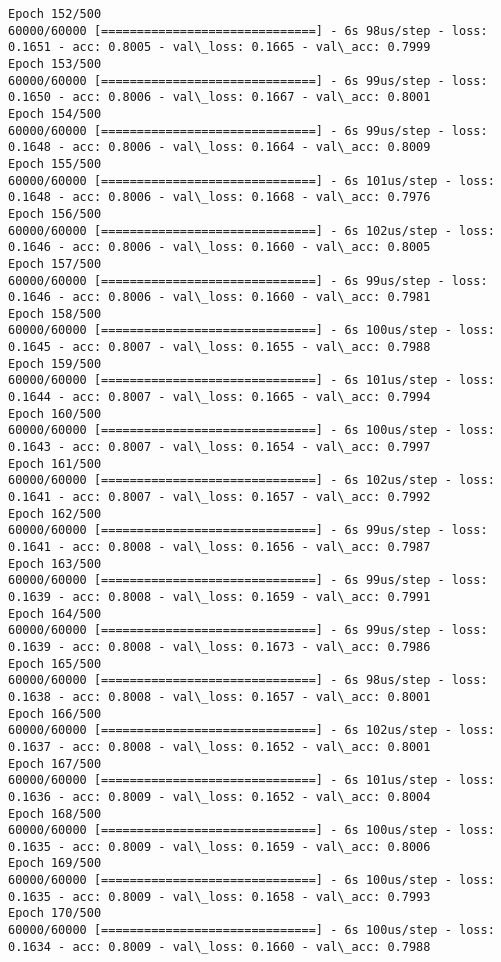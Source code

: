 \documentclass[11pt]{article}
\begin{document}
\begin{Verbatim}[commandchars=\\\{\}]
Epoch 152/500
60000/60000 [==============================] - 6s 98us/step - loss: 0.1651 - acc: 0.8005 - val\_loss: 0.1665 - val\_acc: 0.7999
Epoch 153/500
60000/60000 [==============================] - 6s 99us/step - loss: 0.1650 - acc: 0.8006 - val\_loss: 0.1667 - val\_acc: 0.8001
Epoch 154/500
60000/60000 [==============================] - 6s 99us/step - loss: 0.1648 - acc: 0.8006 - val\_loss: 0.1664 - val\_acc: 0.8009
Epoch 155/500
60000/60000 [==============================] - 6s 101us/step - loss: 0.1648 - acc: 0.8006 - val\_loss: 0.1668 - val\_acc: 0.7976
Epoch 156/500
60000/60000 [==============================] - 6s 102us/step - loss: 0.1646 - acc: 0.8006 - val\_loss: 0.1660 - val\_acc: 0.8005
Epoch 157/500
60000/60000 [==============================] - 6s 99us/step - loss: 0.1646 - acc: 0.8006 - val\_loss: 0.1660 - val\_acc: 0.7981
Epoch 158/500
60000/60000 [==============================] - 6s 100us/step - loss: 0.1645 - acc: 0.8007 - val\_loss: 0.1655 - val\_acc: 0.7988
Epoch 159/500
60000/60000 [==============================] - 6s 101us/step - loss: 0.1644 - acc: 0.8007 - val\_loss: 0.1665 - val\_acc: 0.7994
Epoch 160/500
60000/60000 [==============================] - 6s 100us/step - loss: 0.1643 - acc: 0.8007 - val\_loss: 0.1654 - val\_acc: 0.7997
Epoch 161/500
60000/60000 [==============================] - 6s 102us/step - loss: 0.1641 - acc: 0.8007 - val\_loss: 0.1657 - val\_acc: 0.7992
Epoch 162/500
60000/60000 [==============================] - 6s 99us/step - loss: 0.1641 - acc: 0.8008 - val\_loss: 0.1656 - val\_acc: 0.7987
Epoch 163/500
60000/60000 [==============================] - 6s 99us/step - loss: 0.1639 - acc: 0.8008 - val\_loss: 0.1659 - val\_acc: 0.7991
Epoch 164/500
60000/60000 [==============================] - 6s 99us/step - loss: 0.1639 - acc: 0.8008 - val\_loss: 0.1673 - val\_acc: 0.7986
Epoch 165/500
60000/60000 [==============================] - 6s 98us/step - loss: 0.1638 - acc: 0.8008 - val\_loss: 0.1657 - val\_acc: 0.8001
Epoch 166/500
60000/60000 [==============================] - 6s 102us/step - loss: 0.1637 - acc: 0.8008 - val\_loss: 0.1652 - val\_acc: 0.8001
Epoch 167/500
60000/60000 [==============================] - 6s 101us/step - loss: 0.1636 - acc: 0.8009 - val\_loss: 0.1652 - val\_acc: 0.8004
Epoch 168/500
60000/60000 [==============================] - 6s 100us/step - loss: 0.1635 - acc: 0.8009 - val\_loss: 0.1659 - val\_acc: 0.8006
Epoch 169/500
60000/60000 [==============================] - 6s 100us/step - loss: 0.1635 - acc: 0.8009 - val\_loss: 0.1658 - val\_acc: 0.7993
Epoch 170/500
60000/60000 [==============================] - 6s 100us/step - loss: 0.1634 - acc: 0.8009 - val\_loss: 0.1660 - val\_acc: 0.7988

\end{Verbatim}
\end{document}
